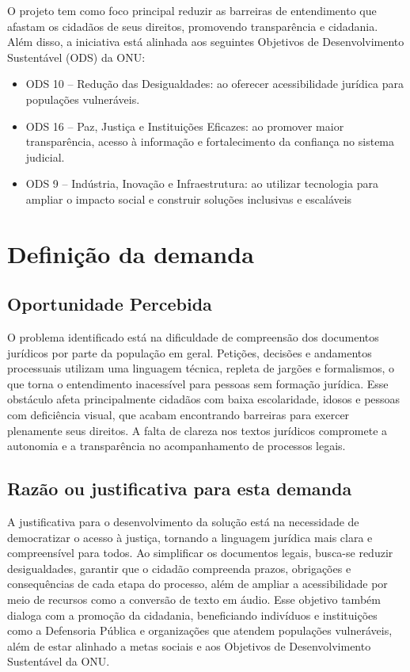 \documentclass{article}
\begin{document}
O projeto tem como foco principal reduzir as barreiras de entendimento que afastam os cidadãos de seus direitos, promovendo transparência e cidadania. Além disso, a iniciativa está alinhada aos seguintes Objetivos de Desenvolvimento Sustentável (ODS) da ONU:
\begin{itemize}
    \item ODS 10 – Redução das Desigualdades: ao oferecer acessibilidade jurídica para populações vulneráveis.
    \item ODS 16 – Paz, Justiça e Instituições Eficazes: ao promover maior transparência, acesso à informação e fortalecimento da confiança no sistema judicial.
    \item ODS 9 – Indústria, Inovação e Infraestrutura: ao utilizar tecnologia para ampliar o impacto social e construir soluções inclusivas e escaláveis
\end{itemize}

\section{Definição da demanda}
    \subsection{Oportunidade Percebida}
    O problema identificado está na dificuldade de compreensão dos documentos jurídicos por parte da população em geral. Petições, decisões e andamentos processuais utilizam uma linguagem técnica, repleta de jargões e formalismos, o que torna o entendimento inacessível para pessoas sem formação jurídica. Esse obstáculo afeta principalmente cidadãos com baixa escolaridade, idosos e pessoas com deficiência visual, que acabam encontrando barreiras para exercer plenamente seus direitos. A falta de clareza nos textos jurídicos compromete a autonomia e a transparência no acompanhamento de processos legais.
    \subsection{Razão ou justificativa para esta demanda}
    A justificativa para o desenvolvimento da solução está na necessidade de democratizar o acesso à justiça, tornando a linguagem jurídica mais clara e compreensível para todos. Ao simplificar os documentos legais, busca-se reduzir desigualdades, garantir que o cidadão compreenda prazos, obrigações e consequências de cada etapa do processo, além de ampliar a acessibilidade por meio de recursos como a conversão de texto em áudio. Esse objetivo também dialoga com a promoção da cidadania, beneficiando indivíduos e instituições como a Defensoria Pública e organizações que atendem populações vulneráveis, além de estar alinhado a metas sociais e aos Objetivos de Desenvolvimento Sustentável da ONU.
\end{document}
